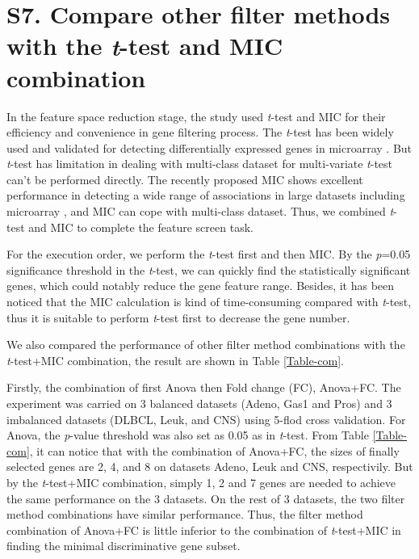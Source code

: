 \documentclass[10pt,journal,compsoc]{IEEEtran}
\begin{document}
	\section*{S7. Compare other filter methods with the \emph{t}-test and MIC combination}

	In the feature space reduction stage, the study used \emph{t}-test and MIC for their efficiency and convenience in gene filtering process. The \emph{t}-test has been widely used and validated for detecting differentially expressed genes in microarray \cite{RN413, RN414, RN421}. But \emph{t}-test has limitation in dealing with multi-class dataset for multi-variate \emph{t}-test can't be performed directly. The recently proposed MIC shows excellent performance in detecting a wide range of associations in large datasets including microarray \cite{W8,W16}, and MIC can cope with multi-class dataset. Thus, we combined \emph{t}-test and MIC to complete the feature screen task.

	For the execution order, we perform the \emph{t}-test first and then MIC. By the \emph{p}=0.05 significance threshold in the \emph{t}-test, we can quickly find the statistically significant genes, which could notably reduce the gene feature range.
	Besides, it has been noticed that the MIC calculation is kind of time-consuming compared with \emph{t}-test, thus it is suitable to perform \emph{t}-test first to decrease the gene number. 


	We also compared the performance of other filter method combinations with the \emph{t}-test+MIC combination, the result are shown in Table \ref{Table-com}.

	Firstly, the combination of first Anova then Fold change (FC), Anova+FC. The experiment was carried on 3 balanced datasets (Adeno, Gas1 and Pros) and 3 imbalanced datasets (DLBCL, Leuk, and CNS) using 5-flod cross validation. For Anova, the \emph{p}-value threshold was also set as 0.05 as in \emph{t}-test. From Table \ref{Table-com}, it can notice that with the combination of Anova+FC, the sizes of finally selected genes are 2, 4, and 8 on datasets Adeno, Leuk and CNS, respectivily. But by the \emph{t}-test+MIC combination, simply 1, 2 and 7 genes are needed to achieve the same performance on the 3 datasets. On the rest of 3 datasets, the two filter method combinations have similar performance. Thus, the filter method combination of Anova+FC is little inferior to the combination of \emph{t}-test+MIC in finding the minimal discriminative gene subset.
\end{document}
